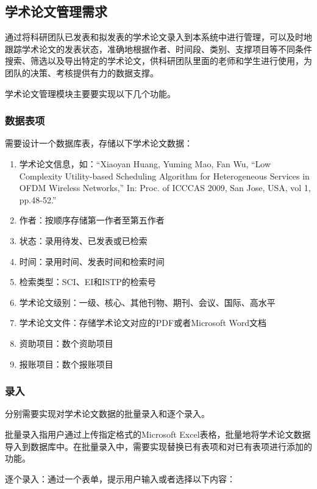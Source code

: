 \subsection{学术论文管理需求}

通过将科研团队已发表和拟发表的学术论文录入到本系统中进行管理，可以及时地跟踪学术论文的发表状态，准确地根据作者、时间段、类别、支撑项目等不同条件搜索、筛选以及导出特定的学术论文，供科研团队里面的老师和学生进行使用，为团队的决策、考核提供有力的数据支撑。

学术论文管理模块主要要实现以下几个功能。

\subsubsection{数据表项}
需要设计一个数据库表，存储以下学术论文数据：
\begin{enumerate}
\item 学术论文信息，如：“Xiaoyan Huang, Yuming Mao, Fan Wu, ``Low Complexity Utility-based Scheduling Algorithm for Heterogeneous Services in OFDM Wireless Networks,'' In: Proc. of ICCCAS 2009, San Jose, USA, vol 1, pp.48-52.”
\item 作者：按顺序存储第一作者至第五作者
\item 状态：录用待发、已发表或已检索
\item 时间：录用时间、发表时间和检索时间
\item 检索类型：SCI、EI和ISTP的检索号
\item 学术论文级别：一级、核心、其他刊物、期刊、会议、国际、高水平
\item 学术论文文件：存储学术论文对应的PDF或者Microsoft Word文档
\item 资助项目：数个资助项目
\item 报账项目：数个报账项目
\end{enumerate}

\subsubsection{录入}
分别需要实现对学术论文数据的批量录入和逐个录入。

批量录入指用户通过上传指定格式的Microsoft Excel表格，批量地将学术论文数据导入到数据库中。在批量录入中，需要实现替换已有表项和对已有表项进行添加的功能。

逐个录入：通过一个表单，提示用户输入或者选择以下内容：

